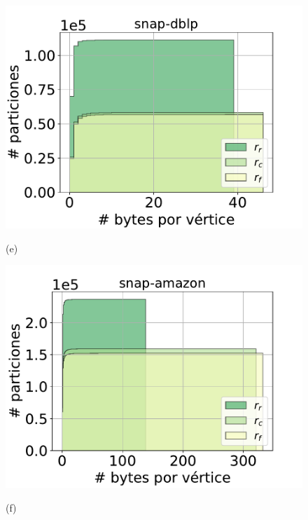 \begin{figure}
    	\begin{minipage}{1\textwidth}
    		\centering
    		\begin{minipage}{0.45\textwidth}
    			\centering
    			\includegraphics[width=1\linewidth]{img/cdf/snap-dblp.pdf}
    			
    			(e)
    		\end{minipage}
    		\begin{minipage}{0.45\textwidth}
    			\centering
    			\includegraphics[width=1\linewidth]{img/cdf/snap-amazon.pdf}
    			
    			(f)
    		\end{minipage}  
    	\end{minipage}
    	

\end{figure}
